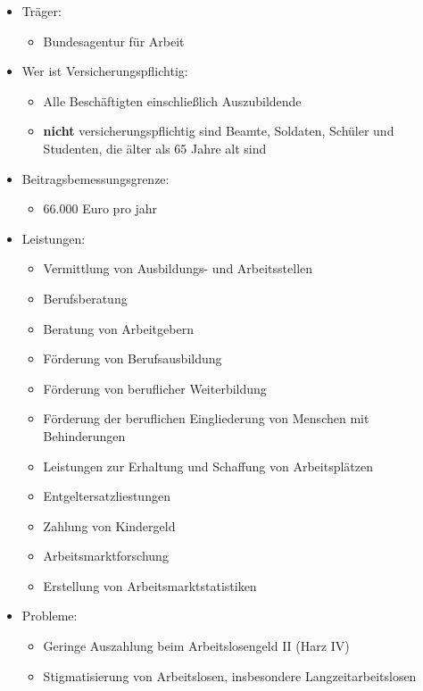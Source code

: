 \documentclass[a4paper, 12pt]{report}
\begin{document}
\begin{multicols}{2}
\begin{itemize}
    \item Träger:
	\begin{itemize}
	    \item Bundesagentur für Arbeit
	\end{itemize}
    \item Wer ist Versicherungspflichtig:
	\begin{itemize}
	    \item Alle Beschäftigten einschließlich Auszubildende
	    \item \textbf{nicht} versicherungspflichtig sind Beamte, Soldaten,
		Schüler und Studenten, die älter als 65 Jahre alt sind
	\end{itemize}
    \item Beitragsbemessungsgrenze:
	\begin{itemize}
	    \item 66.000 Euro pro jahr
	\end{itemize}
    \item Leistungen:
	\begin{itemize}
	    \item Vermittlung von Ausbildungs- und Arbeitsstellen
	    \item Berufsberatung
	    \item Beratung von Arbeitgebern
	    \item Förderung von Berufsausbildung
	    \item Förderung von beruflicher Weiterbildung
	    \item Förderung der beruflichen Eingliederung von Menschen mit
		Behinderungen
	    \item Leistungen zur Erhaltung und Schaffung von Arbeitsplätzen
	    \item Entgeltersatzliestungen
	    \item Zahlung von Kindergeld
	    \item Arbeitsmarktforschung
	    \item Erstellung von Arbeitsmarktstatistiken
	\end{itemize}
    \item Probleme:
	\begin{itemize}
	    \item Geringe Auszahlung beim Arbeitslosengeld II (Harz IV)
	    \item Stigmatisierung von Arbeitslosen, insbesondere
		Langzeitarbeitslosen
	\end{itemize}
\end{itemize}


\end{multicols}
\end{document}
